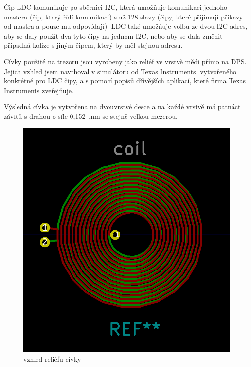 Čip LDC komunikuje po sběrnici I2C, která umožňuje komunikaci jednoho mastera (čip, který řídí komunikaci) s až 128 slavy (čipy, které přijímají příkazy
od mastra a pouze mu odpovídají). LDC také umožňuje volbu ze dvou I2C adres, aby se daly použít dva tyto čipy na jednom I2C, nebo aby se dala změnit 
případná kolize s jiným čipem, který by měl stejnou adresu.

\newpage

Cívky použité na trezoru jsou vyrobeny jako reliéf ve vrstvě mědi přímo na DPS. Jejich vzhled jsem navrhoval v simulátoru od Texas Instruments, 
vytvořeného konkrétně pro LDC čipy, a s pomocí popisů dřívějších aplikací, které firma Texas Instruments zveřejňuje.


Výsledná cívka je vytvořena na dvouvrstvé desce a na každé vrstvě má patnáct závitů s drahou o síle 0,152~mm se stejně velkou mezerou.

\begin{figure}[htbp]
    \centering
    \includegraphics[width=\textwidth]{kapitoly/obrazky/E4/elektronika_tlakove_desky/civka.png}
    \caption{vzhled reliéfu cívky}
    \label{fig:E4-relief_civka}
\end{figure}

